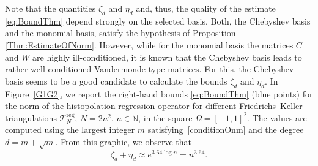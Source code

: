 \documentclass{svjour3}
\begin{document}
\begin{remark}
Note that the quantities $\zeta_d$ and $\eta_d$ and, thus, the quality of the estimate \eqref{eq:BoundThm} depend strongly on the selected basis. Both, the Chebyshev basis and the monomial basis, satisfy the hypothesis of Proposition \ref{Thm:EstimateOfNorm}. However, while for the monomial basis the matrices $ C $ and $ W $ are highly ill-conditioned, it is known that the Chebyshev basis leads to rather well-conditioned Vandermonde-type matrices. For this, the Chebyshev basis seems to be a good candidate to calculate the bounds $\zeta_d$ and $\eta_d$.
In Figure~\ref{G1G2}, we report the right-hand bounds \eqref{eq:BoundThm} (blue points) for the norm of the histopolation-regression operator for different Friedrichs–Keller triangulations $\mathcal{T}_{N}^{\mathrm{reg}}$, $N = 2n^2$, $n\in\mathbb{N}$, in the square $\Omega=[-1,1]^2 $. The values are computed using the largest integer $m$ satisfying~\eqref{conditionOnm} and the degree $d = m + \sqrt{m}$. 
From this graphic, we observe that 
     \begin{equation*}
     \zeta_d + \eta_d \approx e^{3.64 \log n}=n^{3.64}. 
     \end{equation*}
\end{remark}
%
%
\end{document}
